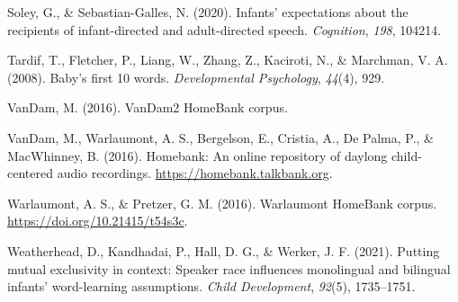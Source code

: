 \documentclass[10pt, letterpaper]{article}
\newenvironment{CSLReferences}%
  {}%
  {\par}
\begin{document}
\begin{CSLReferences}{1}{0}
\leavevmode\hypertarget{ref-soley2020infants}{}%
Soley, G., \& Sebastian-Galles, N. (2020). Infants' expectations about
the recipients of infant-directed and adult-directed speech.
\emph{Cognition}, \emph{198}, 104214.

\leavevmode\hypertarget{ref-tardif2008baby}{}%
Tardif, T., Fletcher, P., Liang, W., Zhang, Z., Kaciroti, N., \&
Marchman, V. A. (2008). Baby's first 10 words. \emph{Developmental
Psychology}, \emph{44}(4), 929.

\leavevmode\hypertarget{ref-vandamcorpus}{}%
VanDam, M. (2016). VanDam2 HomeBank corpus.

\leavevmode\hypertarget{ref-homebank}{}%
VanDam, M., Warlaumont, A. S., Bergelson, E., Cristia, A., De Palma, P.,
\& MacWhinney, B. (2016). Homebank: An online repository of daylong
child-centered audio recordings. \url{https://homebank.talkbank.org}.

\leavevmode\hypertarget{ref-warlaumontcorpus}{}%
Warlaumont, A. S., \& Pretzer, G. M. (2016). Warlaumont HomeBank corpus.
\url{https://doi.org/10.21415/t54s3c}.

\leavevmode\hypertarget{ref-weatherhead2021putting}{}%
Weatherhead, D., Kandhadai, P., Hall, D. G., \& Werker, J. F. (2021).
Putting mutual exclusivity in context: Speaker race influences
monolingual and bilingual infants' word-learning assumptions.
\emph{Child Development}, \emph{92}(5), 1735--1751.

\end{CSLReferences}


\end{document}
